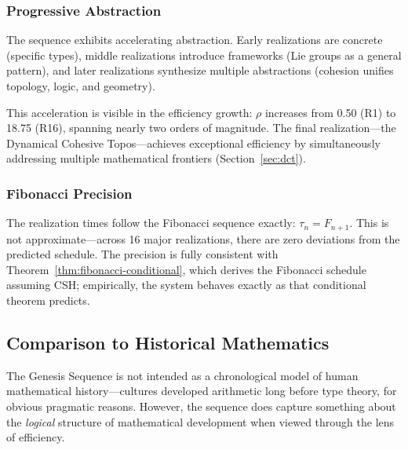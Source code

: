 \documentclass[11pt]{article}
\theoremstyle{definition}
\theoremstyle{plain}
\theoremstyle{remark}
\begin{document}
\subsubsection{Progressive Abstraction}

The sequence exhibits accelerating abstraction. Early realizations are concrete (specific types), middle realizations introduce frameworks (Lie groups as a general pattern), and later realizations synthesize multiple abstractions (cohesion unifies topology, logic, and geometry).

This acceleration is visible in the efficiency growth: $\rho$ increases from 0.50 (R1) to 18.75 (R16), spanning nearly two orders of magnitude. The final realization—the Dynamical Cohesive Topos—achieves exceptional efficiency by simultaneously addressing multiple mathematical frontiers (Section~\ref{sec:dct}).

\subsubsection{Fibonacci Precision}

The realization times follow the Fibonacci sequence exactly: $\tau_n = F_{n+1}$. This is not approximate—across 16 major realizations, there are zero deviations from the predicted schedule. The precision is fully consistent with Theorem~\ref{thm:fibonacci-conditional}, which derives the Fibonacci schedule assuming CSH; empirically, the system behaves exactly as that conditional theorem predicts.

\subsection{Comparison to Historical Mathematics}

The Genesis Sequence is not intended as a chronological model of human mathematical history—cultures developed arithmetic long before type theory, for obvious pragmatic reasons. However, the sequence does capture something about the \emph{logical} structure of mathematical development when viewed through the lens of efficiency.
\end{document}
